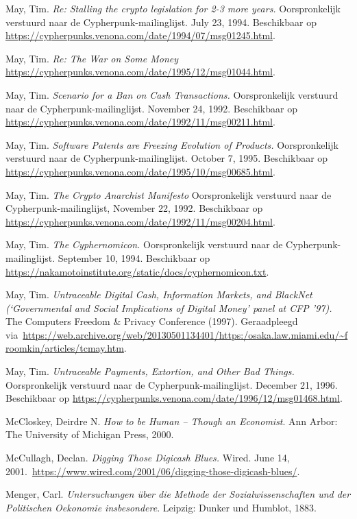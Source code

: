 \documentclass[
  a5paper,
  smalldemyvopaper,11pt,twoside,onecolumn,openright,extrafontsizes,
hidelinks]{memoir}
\begin{document}
{May, Tim. \emph{Re: Stalling the crypto legislation for 2-3 more years.}
Oorspronkelijk verstuurd naar de Cypherpunk-mailinglijst. July 23, 1994.
Beschikbaar op
\url{https://cypherpunks.venona.com/date/1994/07/msg01245.html}.

May, Tim. \emph{Re: The War on Some Money}
\url{https://cypherpunks.venona.com/date/1995/12/msg01044.html}.

May, Tim. \emph{Scenario for a Ban on Cash Transactions.} Oorspronkelijk
verstuurd naar de Cypherpunk-mailinglijst. November 24, 1992.
Beschikbaar op
\url{https://cypherpunks.venona.com/date/1992/11/msg00211.html}.

May, Tim. \emph{Software Patents are Freezing Evolution of Products.}
Oorspronkelijk verstuurd naar de Cypherpunk-mailinglijst. October 7,
1995. Beschikbaar op
\url{https://cypherpunks.venona.com/date/1995/10/msg00685.html}.

May, Tim. \emph{The Crypto Anarchist Manifesto} Oorspronkelijk verstuurd
naar de Cypherpunk-mailinglijst, November 22, 1992. Beschikbaar op
\url{https://cypherpunks.venona.com/date/1992/11/msg00204.html}.

May, Tim. \emph{The Cyphernomicon.} Oorspronkelijk verstuurd naar de
Cypherpunk-mailinglijst. September 10, 1994. Beschikbaar op
\url{https://nakamotoinstitute.org/static/docs/cyphernomicon.txt}.

May, Tim. \emph{Untraceable Digital Cash, Information Markets, and
BlackNet (`Governmental and Social Implications of Digital Money' panel
at CFP '97).} The Computers Freedom \& Privacy Conference (1997).
Geraadpleegd
via~\url{https://web.archive.org/web/20130501134401/https:/osaka.law.miami.edu/~froomkin/articles/tcmay.htm}.

May, Tim. \emph{Untraceable Payments, Extortion, and Other Bad Things.}
Oorspronkelijk verstuurd naar de Cypherpunk-mailinglijst. December 21,
1996. Beschikbaar op
\url{https://cypherpunks.venona.com/date/1996/12/msg01468.html}.

McCloskey, Deirdre N. \emph{How to be Human -- Though an Economist}. Ann
Arbor: The University of Michigan Press, 2000.

McCullagh, Declan. \emph{Digging Those Digicash Blues.} Wired. June 14,
2001.~\url{https://www.wired.com/2001/06/digging-those-digicash-blues/}.

Menger, Carl. \emph{Untersuchungen über die Methode der
Sozialwissenschaften und der Politischen Oekonomie insbesondere}.
Leipzig: Dunker und Humblot, 1883.

}
\end{document}
